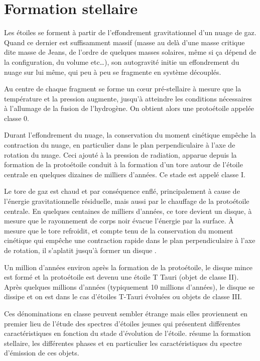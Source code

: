 

\section{Formation stellaire}
Les étoiles se forment à partir de l'effondrement gravitationnel d'un nuage de gaz. Quand ce dernier est suffisamment massif (masse au delà d'une masse critique dite masse de Jeans, de l'ordre de quelques masses solaires, même si ça dépend de la configuration, du volume etc\dots), son autogravité initie un effondrement du nuage sur lui même, qui peu à peu se fragmente en système découplés. 

Au centre de chaque fragment se forme un cœur pré-stellaire à mesure que la température et la pression augmente, jusqu'à atteindre les conditions nécessaires à l'allumage de la fusion de l'hydrogène. On obtient alors une protoétoile appelée \og classe 0\fg. 

Durant l'effondrement du nuage, la conservation du moment cinétique empêche la contraction du nuage, en particulier dans le plan perpendiculaire à l'axe de rotation du nuage. Ceci ajouté à la pression de radiation, apparue depuis la formation de la protoétoile conduit à la formation d'un tore autour de l'étoile centrale en quelques dizaines de milliers d'années. Ce stade est appelé \og classe I\fg.

Le tore de gaz est chaud et par conséquence enflé, principalement à cause de l'énergie gravitationnelle résiduelle, mais aussi par le chauffage de la protoétoile centrale.
En quelques centaines de milliers d'années, ce tore devient un disque, à mesure que le rayonnement de corps noir évacue l'énergie par la surface. À mesure que le tore refroidit, et compte tenu de la conservation du moment cinétique qui empêche une contraction rapide dans le plan perpendiculaire à l'axe de rotation, il s'aplatit jusqu'à former un disque \citep{williams2011protoplanetary}. 

Un million d'années environ après la formation de la protoétoile, le disque mince est formé et la protoétoile est devenu une étoile T Tauri (objet de classe II). Après quelques millions d'années (typiquement 10 millions d'années), le disque se dissipe et on est dans le cas d'étoiles T-Tauri évoluées ou objets de classe III. 

Ces dénominations en classe peuvent sembler étrange mais elles proviennent en premier lieu de l'étude des spectres d'étoiles jeunes qui présentent différentes caractéristiques en fonction du stade d'évolution de l'étoile.  résume la formation stellaire, les différentes phases et en particulier les caractéristiques du spectre d'émission de ces objets.
 
